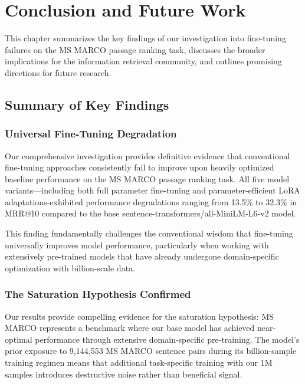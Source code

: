 
\chapter{Conclusion and Future Work} %

\label{Chapter6} %


This chapter summarizes the key findings of our investigation into fine-tuning failures on the MS MARCO passage ranking task, discusses the broader implications for the information retrieval community, and outlines promising directions for future research.

\section{Summary of Key Findings}

\subsection{Universal Fine-Tuning Degradation}

Our comprehensive investigation provides definitive evidence that conventional fine-tuning approaches consistently fail to improve upon heavily optimized baseline performance on the MS MARCO passage ranking task. All five model variants—including both full parameter fine-tuning and parameter-efficient LoRA adaptations-exhibited performance degradations ranging from 13.5\% to 32.3\% in MRR@10 compared to the base sentence-transformers/all-MiniLM-L6-v2 model.

This finding fundamentally challenges the conventional wisdom that fine-tuning universally improves model performance, particularly when working with extensively pre-trained models that have already undergone domain-specific optimization with billion-scale data.

\subsection{The Saturation Hypothesis Confirmed}

Our results provide compelling evidence for the saturation hypothesis: MS MARCO represents a benchmark where our base model has achieved near-optimal performance through extensive domain-specific pre-training. The model's prior exposure to 9,144,553 MS MARCO sentence pairs during its billion-sample training regimen means that additional task-specific training with our 1M samples introduces destructive noise rather than beneficial signal.

